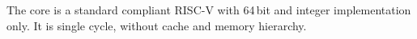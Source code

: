 The core is a standard compliant RISC-V with 64\,bit and integer implementation only. It is single cycle, without cache and memory hierarchy.